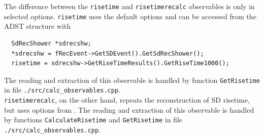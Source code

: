 \documentclass[12pt,a4paper]{report}
\begin{document}
The difference between the \texttt{risetime} and \texttt{risetimerecalc} observables is only in selected options. \texttt{risetime} uses the default options and can be accessed from the ADST structure with
\begin{verbatim}
  SdRecShower *sdrecshw;
  *sdrecshw = fRecEvent->GetSDEvent().GetSdRecShower();
  risetime = sdrecshw->GetRiseTimeResults().GetRiseTime1000();
\end{verbatim}
The reading and extraction of this observable is handled by function \texttt{GetRisetime} in file \texttt{./src/calc\_observables.cpp}.\\
\texttt{risetimerecalc}, on the other hand, repeats the reconstruction of SD risetime, but uses options from \cite{deltaMethod}. The reading and extraction of this observable is handled by functions \texttt{CalculateRisetime} and \texttt{GetRisetime} in file \texttt{./src/calc\_observables.cpp}.
\end{document}
